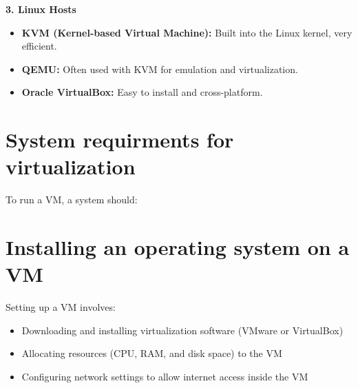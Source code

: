 \vspace{0.5 cm}

\textbf{3. Linux Hosts}
\begin{itemize}

    \item \textbf{KVM (Kernel-based Virtual Machine):} Built into the Linux kernel, very efficient.

    \item \textbf{QEMU:} Often used with KVM for emulation and virtualization.

    \item \textbf{Oracle VirtualBox:} Easy to install and cross-platform.

\end{itemize}

\section{System requirments for virtualization}
To run a VM, a system should:


\section{Installing an operating system on a VM}
Setting up a VM involves:

\begin{itemize}

    \item Downloading and installing virtualization software (VMware or VirtualBox)

    \item Allocating resources (CPU, RAM, and disk space) to the VM

    \item Configuring network settings to allow internet access inside the VM

\end{itemize}

